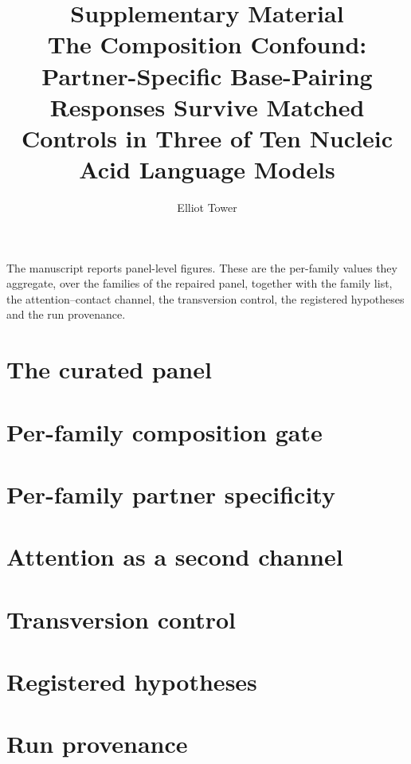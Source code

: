 \documentclass[11pt]{article}
\title{Supplementary Material\\The Composition Confound: Partner-Specific
Base-Pairing Responses Survive Matched Controls in Three of Ten Nucleic Acid
Language Models}
\author{Elliot Tower}
\date{}
\begin{document}
\maketitle

The manuscript reports panel-level figures. These are the per-family values
they aggregate, over the \panelN{} families of the repaired panel, together
with the family list, the attention--contact channel, the transversion control,
the registered hypotheses and the run provenance.

\section*{The curated panel}



\section*{Per-family composition gate}

{\setlength{\tabcolsep}{4pt}

}


\section*{Per-family partner specificity}

{\setlength{\tabcolsep}{4pt}

}


\section*{Attention as a second channel}



\section*{Transversion control}



\section*{Registered hypotheses}



\section*{Run provenance}


\end{document}
